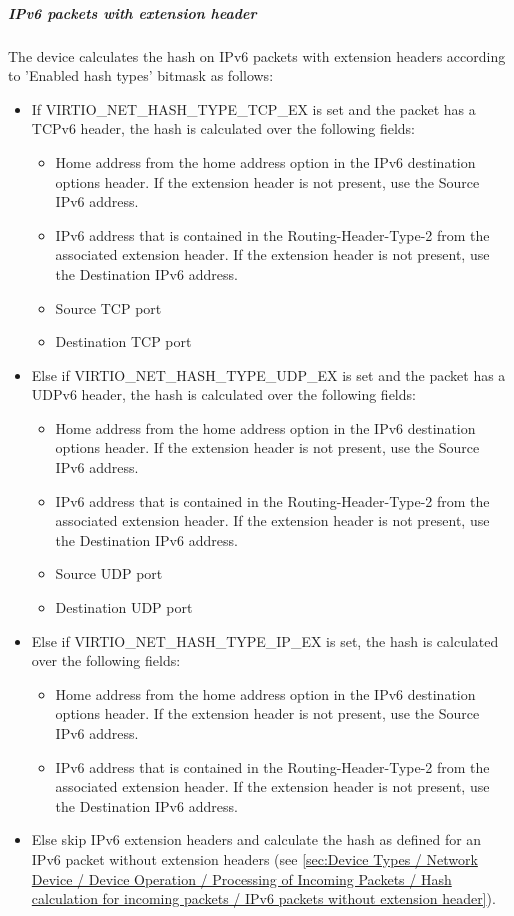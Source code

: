 \subparagraph{IPv6 packets with extension header}
\label{sec:Device Types / Network Device / Device Operation / Processing of Incoming Packets / Hash calculation for incoming packets / IPv6 packets with extension header}
The device calculates the hash on IPv6 packets with extension
headers according to 'Enabled hash types' bitmask as follows:
\begin{itemize}
\item If VIRTIO_NET_HASH_TYPE_TCP_EX is set and the packet
has a TCPv6 header, the hash is calculated over the following fields:
\begin{itemize}
\item Home address from the home address option in the IPv6 destination options header. If the extension header is not present, use the Source IPv6 address.
\item IPv6 address that is contained in the Routing-Header-Type-2 from the associated extension header. If the extension header is not present, use the Destination IPv6 address.
\item Source TCP port
\item Destination TCP port
\end{itemize}
\item Else if VIRTIO_NET_HASH_TYPE_UDP_EX is set and the
packet has a UDPv6 header, the hash is calculated over the following fields:
\begin{itemize}
\item Home address from the home address option in the IPv6 destination options header. If the extension header is not present, use the Source IPv6 address.
\item IPv6 address that is contained in the Routing-Header-Type-2 from the associated extension header. If the extension header is not present, use the Destination IPv6 address.
\item Source UDP port
\item Destination UDP port
\end{itemize}
\item Else if VIRTIO_NET_HASH_TYPE_IP_EX is set, the hash is
calculated over the following fields:
\begin{itemize}
\item Home address from the home address option in the IPv6 destination options header. If the extension header is not present, use the Source IPv6 address.
\item IPv6 address that is contained in the Routing-Header-Type-2 from the associated extension header. If the extension header is not present, use the Destination IPv6 address.
\end{itemize}
\item Else skip IPv6 extension headers and calculate the hash as
defined for an IPv6 packet without extension headers
(see \ref{sec:Device Types / Network Device / Device Operation / Processing of Incoming Packets / Hash calculation for incoming packets / IPv6 packets without extension header}).
\end{itemize}

